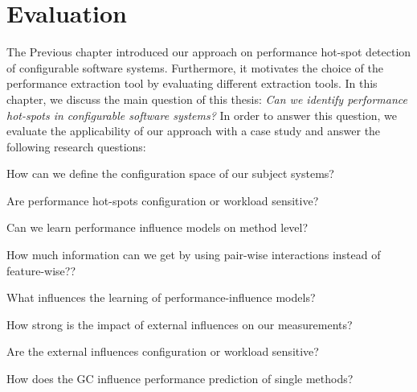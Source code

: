 \chapter{Evaluation}
\label{chap:analysis}

The Previous chapter introduced our approach on performance hot-spot detection of configurable software systems. Furthermore, it motivates the choice of the performance extraction tool by evaluating different extraction tools. In this chapter, we discuss the main question of this thesis: \emph{Can we identify performance hot-spots in configurable software systems?} In order to answer this question, we evaluate the applicability of our approach with a case study and answer the following research questions:


\begin{researchq}
	\item How can we define the configuration space of our subject systems?
	\label{rq:config_space}

	\item Are performance hot-spots configuration or workload sensitive?
	\label{rq:sensitivity}

	\item Can we learn performance influence models on method level?
	\label{rq:perf_infl_model}

	\begin{researchq}
		\item How much information can we get by using pair-wise interactions instead of feature-wise??
		\label{rq:interactions}
		\item What influences the learning of performance-influence models?
		\label{rq:learning influence}
	\end{researchq}

	\item How strong is the impact of external influences on our measurements?
	\label{rq:external_influence}
	
	\begin{researchq}
		\item Are the external influences configuration or workload sensitive?
		\label{rq:bla}
		\item How does the \ac{GC} influence performance prediction of single methods?
	\end{researchq}

\end{researchq}

% 

